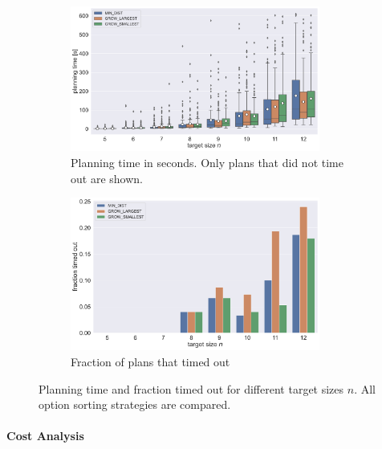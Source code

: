 \begin{figure}
	\centering
	\begin{subfigure}[b]{\textwidth}
		\centering
		\includegraphics[width=0.9\textwidth]{figures/plots/AFN_time.pdf}
		\caption{Planning time in seconds. Only plans that did not time out are shown.}
		\label{fig:AFN_time}
	\end{subfigure}

	\begin{subfigure}[b]{\textwidth}
		\centering
		\includegraphics[width=0.9\textwidth]{figures/plots/AFN_timeout.pdf}
		\caption{Fraction of plans that timed out}
		\label{fig:AFN_timeout}
	\end{subfigure}
	\caption[Planning time and fraction timed out for different target sizes]{Planning time and fraction timed out for different target sizes $n$. All option sorting strategies are compared.}
	\label{fig:AFN_timestats}
\end{figure}



\paragraph{Cost Analysis}

